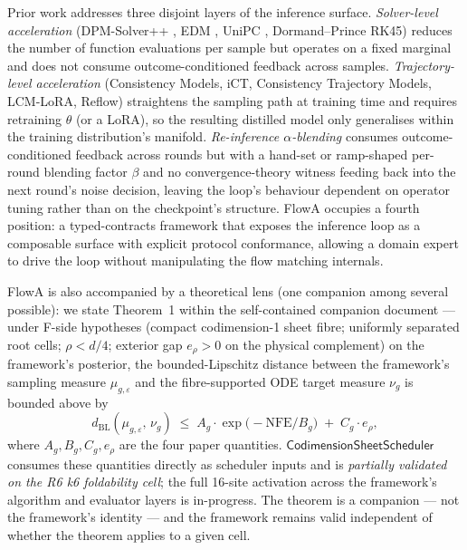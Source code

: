 \documentclass[journal,twocolumn,final]{IEEEtran}
\newcommand{\NFE}{\mathrm{NFE}}
\newcommand{\egap}{e_\rho}
\newcommand{\sheetA}{A_g}
\newcommand{\sheetB}{B_g}
\newcommand{\sheetC}{C_g}
\begin{document}
Prior work addresses three disjoint layers of the inference surface.
\emph{Solver-level acceleration} (DPM-Solver++ \cite{lu2022dpm}, EDM
\cite{karras2022edm}, UniPC \cite{zhao2023unipc}, Dormand--Prince RK45)
reduces the number of function evaluations per sample but operates on a fixed
marginal and does not consume outcome-conditioned feedback across samples.
\emph{Trajectory-level acceleration} (Consistency Models, iCT, Consistency
Trajectory Models, LCM-LoRA, Reflow) straightens the sampling path at training
time and requires retraining $\theta$ (or a LoRA), so the resulting distilled
model only generalises within the training distribution's manifold.
\emph{Re-inference $\alpha$-blending} \cite{sabour2024,sabour2024fastdllm,yu2024abcache,zwick2025lediflow}
consumes outcome-conditioned feedback across rounds but with a hand-set or
ramp-shaped per-round blending factor $\beta$ and no convergence-theory
witness feeding back into the next round's noise decision, leaving the loop's
behaviour dependent on operator tuning rather than on the checkpoint's
structure. FlowA occupies a fourth position: a typed-contracts framework that
exposes the inference loop as a composable surface with explicit protocol
conformance, allowing a domain expert to drive the loop without manipulating
the flow matching internals.

FlowA is also accompanied by a theoretical lens (one companion among several
possible): we state Theorem~1 within the self-contained companion document
--- under F-side hypotheses (compact codimension-1 sheet fibre; uniformly
separated root cells; $\rho < d/4$; exterior gap $\egap > 0$ on the physical
complement) on the framework's posterior, the bounded-Lipschitz distance
between the framework's sampling measure $\mu_{g,\varepsilon}$ and the
fibre-supported ODE target measure $\nu_g$ is bounded above by
\begin{equation}\label{eq:thm1}
d_{\mathrm{BL}}(\mu_{g,\varepsilon},\, \nu_g) \;\le\; \sheetA \cdot
\exp\bigl(-\NFE/\sheetB\bigr) \;+\; \sheetC \cdot \egap,
\end{equation}
where $\sheetA, \sheetB, \sheetC, \egap$ are the four paper quantities.
$\mathsf{CodimensionSheetScheduler}$ consumes these quantities directly as
scheduler inputs and is \emph{partially validated on the R6 k6 foldability
cell}; the full 16-site activation across the framework's algorithm and
evaluator layers is in-progress. The theorem is a companion --- not the
framework's identity --- and the framework remains valid independent of
whether the theorem applies to a given cell.
\end{document}

